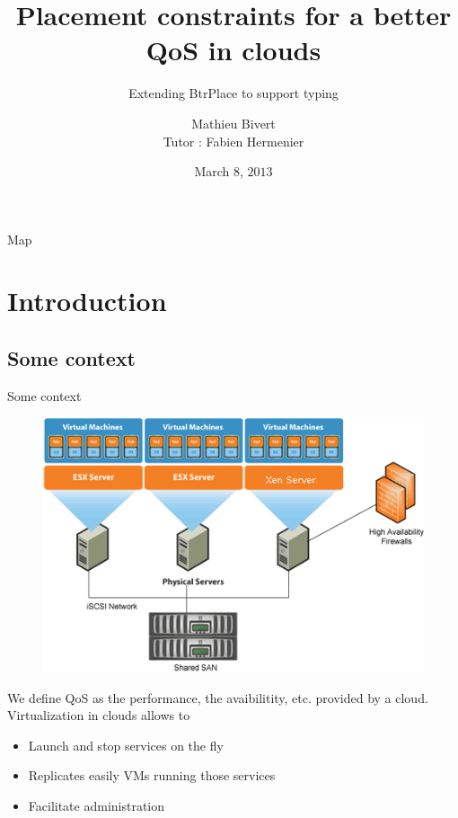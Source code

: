 \documentclass{beamer}
\title{Placement constraints for a better QoS in clouds}
\subtitle{Extending BtrPlace to support typing}
\author[]{Mathieu Bivert\\Tutor : Fabien Hermenier}
\institute{Polytech'Nice Sophia}
\date{March $8$, $2013$}
\begin{document}
\begin{frame}{}
\titlepage
\end{frame}

\begin{frame}{Map}
\tableofcontents
\end{frame}

\section{Introduction}
\subsection{Some context}
\begin{frame}{Some context}
\begin{figure}[!ht]
	\centering
	\includegraphics[scale=.4]{imgs/samplecloud.png}
\end{figure}

We define QoS as the performance, the avaibilitity, etc. provided by
a cloud.
Virtualization in clouds allows to
\begin{itemize}
	\item Launch and stop services on the fly
	\item Replicates easily VMs running those services
	\item Facilitate administration
\end{itemize}
\end{frame}
\end{document}
